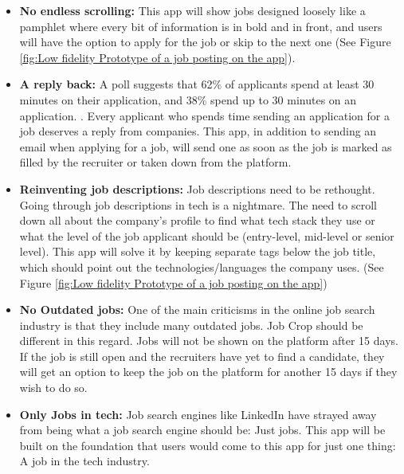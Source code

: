 \begin{itemize}
    \item \textbf{No endless scrolling:} This app will show jobs designed loosely like a pamphlet where every bit of information is in bold and in front, and users will have the option to apply for the job or skip to the next one (See Figure \ref{fig:Low fidelity Prototype of a job posting on the app}). 
    \item \textbf{A reply back:} A poll suggests that 62\% of applicants spend at least 30 minutes on their application, and 38\% spend up to 30 minutes on an application. \parencite{Reference18}. Every applicant who spends time sending an application for a job deserves a reply from companies. This app, in addition to sending an email when applying for a job, will send one as soon as the job is marked as filled by the recruiter or taken down from the platform.
    \item \textbf{Reinventing job descriptions:} Job descriptions need to be rethought. Going through job descriptions in tech is a nightmare. The need to scroll down all about the company's profile to find what tech stack they use or what the level of the job applicant should be (entry-level, mid-level or senior level). This app will solve it by keeping separate tags below the job title, which should point out the technologies/languages the company uses. (See Figure \ref{fig:Low fidelity Prototype of a job posting on the app})
    \item \textbf{No Outdated jobs:} One of the main criticisms in the online job search industry is that they include many outdated jobs. Job Crop should be different in this regard. Jobs will not be shown on the platform after 15 days. If the job is still open and the recruiters have yet to find a candidate, they will get an option to keep the job on the platform for another 15 days if they wish to do so.
    \item \textbf{Only Jobs in tech:} Job search engines like LinkedIn have strayed away from being what a job search engine should be: Just jobs. This app will be built on the foundation that users would come to this app for just one thing: A job in the tech industry.
\end{itemize}